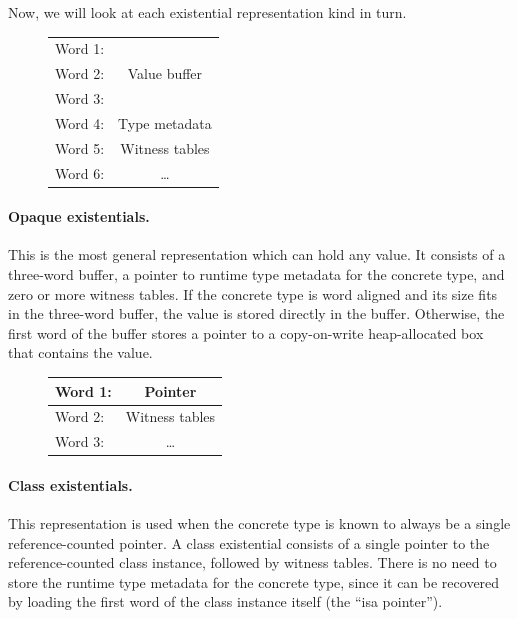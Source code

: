 \documentclass[../generics]{subfiles}
\begin{document}
Now, we will look at each existential representation kind in turn.

\begin{figure}
\begin{minipage}{13em}
\begin{center}
\begin{tabular}{|l|c|}
\hline
Word 1:&\\
Word 2:&Value buffer\\
Word 3:&\\
\hline
\hline
Word 4:&Type metadata\\
\hline
\hline
Word 5:&Witness tables\\
Word 6:&\ldots\\
\hline
\end{tabular}
\end{center}
\end{minipage}
\end{figure}

\paragraph{Opaque existentials.} This is the most general representation which can hold any value. It consists of a three-word buffer, a pointer to runtime type metadata for the concrete type, and zero or more witness tables. If the concrete type is word aligned and its size fits in the three-word buffer, the value is stored directly in the buffer. Otherwise, the first word of the buffer stores a pointer to a copy-on-write heap-allocated box that contains the value.

\begin{figure}
\begin{minipage}{13em}
\begin{center}
\begin{tabular}{|l|c|}
\hline
Word 1:&Pointer\\
\hline
\hline
Word 2:&Witness tables\\
Word 3:&\ldots\\
\hline
\end{tabular}
\end{center}
\end{minipage}
\end{figure}

\paragraph{Class existentials.} This representation is used when the concrete type is known to always be a single reference-counted pointer. A class existential consists of a single pointer to the reference-counted class instance, followed by witness tables. There is no need to store the runtime type metadata for the concrete type, since it can be recovered by loading the first word of the class instance itself (the ``isa pointer'').
\end{document}
